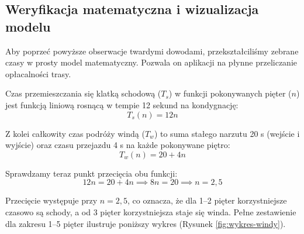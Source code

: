 \documentclass[14pt,a4paper]{extarticle}
\begin{document}
\subsection{Weryfikacja matematyczna i wizualizacja modelu}

Aby poprzeć powyższe obserwacje twardymi dowodami, przekształciliśmy zebrane czasy w prosty model matematyczny. Pozwala on aplikacji na płynne przeliczanie opłacalności trasy.

Czas przemieszczania się klatką schodową ($T_s$) w funkcji pokonywanych pięter ($n$) jest funkcją liniową rosnącą w tempie 12 sekund na kondygnację:
\begin{equation}
    T_s(n) = 12n
\end{equation}

Z kolei całkowity czas podróży windą ($T_w$) to suma stałego narzutu 20 s (wejście i wyjście) oraz czasu przejazdu 4 s na każde pokonywane piętro:
\begin{equation}
    T_w(n) = 20 + 4n
\end{equation}

Sprawdzamy teraz punkt przecięcia obu funkcji:
\begin{equation}
    12n = 20 + 4n \implies 8n = 20 \implies n = 2{,}5
\end{equation}

Przecięcie występuje przy $n=2{,}5$, co oznacza, że dla 1--2 pięter korzystniejsze czasowo są schody, a od 3 pięter korzystniejsza staje się winda. Pełne zestawienie dla zakresu 1--5 pięter ilustruje poniższy wykres (Rysunek \ref{fig:wykres-windy}).
\end{document}
